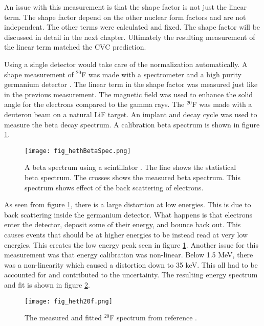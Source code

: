 \documentclass[../MaxHughesThesis.tex]{subfiles}
\begin{document}
An issue with this measurement is that the shape factor is not just the linear term.
The shape factor depend on the other nuclear form factors and are not independent.
The other terms were calculated and fixed.
The shape factor will be discussed in detail in the next chapter.
Ultimately the resulting measurement of the linear term matched the CVC prediction.

Using a single detector would take care of the normalization automatically. 
A shape measurement of $^{20}$F was made with a spectrometer and a high purity germanium detector \cite{Het89}.
The linear term in the shape factor was measured just like in the previous measurement.
The magnetic field was used to enhance the solid angle for the electrons compared to the gamma rays.
The $^{20}$F was made with a deuteron beam on a natural LiF target. 
An implant and decay cycle was used to measure the beta decay spectrum. 
A calibration beta spectrum is shown in figure \ref{fig:hethspec}.

\begin{figure}[!htb]
	\centerline{\texttt{[image: fig\_hethBetaSpec.png]}}
	\caption{A beta spectrum using a scintillator \cite{Het89}.
		    The line shows the statistical beta spectrum.
		    The crosses shows the measured beta spectrum.
		    This spectrum shows effect of the back scattering of electrons.}
	\label{fig:hethspec}
\end{figure}

As seen from figure \ref{fig:hethspec}, there is a large distortion at low energies.
This is due to back scattering inside the germanium detector.
What happens is that electrons enter the detector, deposit some of their energy, and bounce back out.
This causes events that should be at higher energies to be instead read at very low energies.
This creates the low energy peak seen in figure \ref{fig:hethspec}.
Another issue for this measurement was that energy calibration was non-linear.
Below 1.5 MeV, there was a non-linearity which caused a distortion down to 35 keV. 
This all had to be accounted for and contributed to the uncertainty.
The resulting energy spectrum and fit is shown in figure \ref{fig:heth20Fspec}.

\begin{figure}[!htb]
	\centerline{\texttt{[image: fig\_heth20f.png]}}
	\caption{The measured and fitted $^{20}$F spectrum from reference \cite{Het89}.}
	\label{fig:heth20Fspec}
\end{figure}
\end{document}
